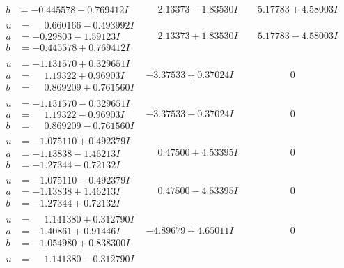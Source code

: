 \documentclass[1p]{elsarticle_modified}
\theoremstyle{definition}
\begin{document}
$$\begin{array}{c|c|c}
\begin{aligned}
b &= -0.445578 - 0.769412 I\end{aligned}
 & \phantom{-}2.13373 - 1.83530 I & \phantom{-}5.17783 + 4.58003 I \\ \hline\begin{aligned}
u &= \phantom{-}0.660166 - 0.493992 I \\
a &= -0.29803 - 1.59123 I \\
b &= -0.445578 + 0.769412 I\end{aligned}
 & \phantom{-}2.13373 + 1.83530 I & \phantom{-}5.17783 - 4.58003 I \\ \hline\begin{aligned}
u &= -1.131570 + 0.329651 I \\
a &= \phantom{-}1.19322 + 0.96903 I \\
b &= \phantom{-}0.869209 + 0.761560 I\end{aligned}
 & -3.37533 + 0.37024 I & \phantom{-0.000000 } 0 \\ \hline\begin{aligned}
u &= -1.131570 - 0.329651 I \\
a &= \phantom{-}1.19322 - 0.96903 I \\
b &= \phantom{-}0.869209 - 0.761560 I\end{aligned}
 & -3.37533 - 0.37024 I & \phantom{-0.000000 } 0 \\ \hline\begin{aligned}
u &= -1.075110 + 0.492379 I \\
a &= -1.13838 - 1.46213 I \\
b &= -1.27344 - 0.72132 I\end{aligned}
 & \phantom{-}0.47500 + 4.53395 I & \phantom{-0.000000 } 0 \\ \hline\begin{aligned}
u &= -1.075110 - 0.492379 I \\
a &= -1.13838 + 1.46213 I \\
b &= -1.27344 + 0.72132 I\end{aligned}
 & \phantom{-}0.47500 - 4.53395 I & \phantom{-0.000000 } 0 \\ \hline\begin{aligned}
u &= \phantom{-}1.141380 + 0.312790 I \\
a &= -1.40861 + 0.91446 I \\
b &= -1.054980 + 0.838300 I\end{aligned}
 & -4.89679 + 4.65011 I & \phantom{-0.000000 } 0 \\ \hline\begin{aligned}
u &= \phantom{-}1.141380 - 0.312790 I \\

\end{aligned}
\end{array}$$
\end{document}
